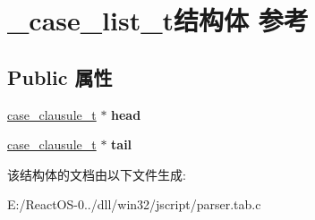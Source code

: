 \hypertarget{struct__case__list__t}{}\section{\+\_\+case\+\_\+list\+\_\+t结构体 参考}
\label{struct__case__list__t}
\subsection*{Public 属性}
\begin{DoxyCompactItemize}
\item 
\mbox{\label{struct__case__list__t_a84cf75ba1c5cf2f25d9f94d8db314543}} 
\hyperlink{struct__case__clausule__t}{case\+\_\+clausule\+\_\+t} $\ast$ {\bfseries head}
\item 
\mbox{\label{struct__case__list__t_ab518d398466748e49430a3a86356156f}} 
\hyperlink{struct__case__clausule__t}{case\+\_\+clausule\+\_\+t} $\ast$ {\bfseries tail}
\end{DoxyCompactItemize}


该结构体的文档由以下文件生成\+:\begin{DoxyCompactItemize}
\item 
E\+:/\+React\+O\+S-\/0../dll/win32/jscript/parser.\+tab.\+c\end{DoxyCompactItemize}
